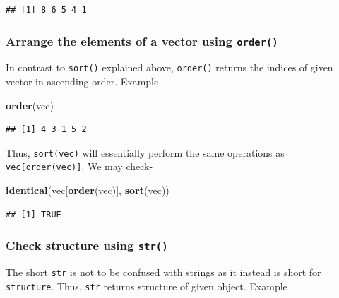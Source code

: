 \documentclass[
]{book}
\newenvironment{Shaded}{\begin{snugshade}}{\end{snugshade}}
\newcommand{\FunctionTok}[1]{\textcolor[rgb]{0.13,0.29,0.53}{\textbf{#1}}}
\newcommand{\NormalTok}[1]{#1}
\begin{document}
\begin{verbatim}
## [1] 8 6 5 4 1
\end{verbatim}

\hypertarget{arrange-the-elements-of-a-vector-using-order}{%
\subsubsection*{\texorpdfstring{Arrange the elements of a vector using \texttt{order()}}{Arrange the elements of a vector using order()}}\label{arrange-the-elements-of-a-vector-using-order}}

In contrast to \texttt{sort()} explained above, \texttt{order()} returns the indices of given vector in ascending order. Example

\begin{Shaded}
\begin{Highlighting}[]
\FunctionTok{order}\NormalTok{(vec)}
\end{Highlighting}
\end{Shaded}

\begin{verbatim}
## [1] 4 3 1 5 2
\end{verbatim}

Thus, \texttt{sort(vec)} will essentially perform the same operations as \texttt{vec{[}order(vec){]}}. We may check-

\begin{Shaded}
\begin{Highlighting}[]
\FunctionTok{identical}\NormalTok{(vec[}\FunctionTok{order}\NormalTok{(vec)], }\FunctionTok{sort}\NormalTok{(vec))}
\end{Highlighting}
\end{Shaded}

\begin{verbatim}
## [1] TRUE
\end{verbatim}

\hypertarget{check-structure-using-str}{%
\subsubsection*{\texorpdfstring{Check structure using \texttt{str()}}{Check structure using str()}}\label{check-structure-using-str}}

The short \texttt{str} is not to be confused with strings as it instead is short for \texttt{structure}. Thus, \texttt{str} returns structure of given object. Example
\end{document}
